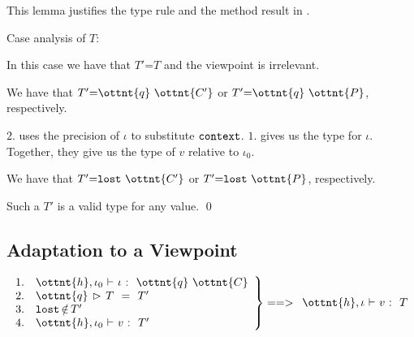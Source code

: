 \noindent
This lemma justifies the type rule  and the
method result in .

Case analysis of $T$:


In this case we have that $T'  \textsf{=}  T$ and the viewpoint is
irrelevant.




We have that $T'  \textsf{=}    \ottnt{q} \  \ottnt{C'}  $ or $T'  \textsf{=}    \ottnt{q} \  \ottnt{P}  $, respectively.

$2.$ uses the precision of $\iota$ to substitute $ \texttt{\upshape{context}\,\!} $.
$1.$ gives us the type for $\iota$.
Together, they give us the type of $v$ relative to $\iota_{{\mathrm{0}}}$.


We have that $T'  \textsf{=}     \texttt{\upshape{lost}\,\!}  \  \ottnt{C'}  $ or $T'  \textsf{=}     \texttt{\upshape{lost}\,\!}  \  \ottnt{P}  $, respectively.

Such a $T'$ is a valid type for any value.
\qed




\subsection{Adaptation to a Viewpoint}

\begin{lemma}
\label{enerj:lemma:decomp}
\[
\left.
\begin{array}{ll}
1. &  \ottnt{h} ,  \iota_{{\mathrm{0}}} \  \textsf{$\vdash$} \  \iota \  \textsf{:} \ \    \ottnt{q} \  \ottnt{C}   \\
2. &  \ottnt{q} \, \rhd\,  T \ \  \textsf{=} \ \  T' \\
3. &  \texttt{\upshape{lost}\,\!}  \, \textsf{$\notin$} \, T'\\
4. &  \ottnt{h} ,  \iota_{{\mathrm{0}}} \  \textsf{$\vdash$} \  v \  \textsf{:} \ \  T' \\
\end{array}
\right\} ==>
\begin{array}{l}
 \ottnt{h} ,  \iota \  \textsf{$\vdash$} \  v \  \textsf{:} \ \  T 
\end{array}
\]
\end{lemma}

